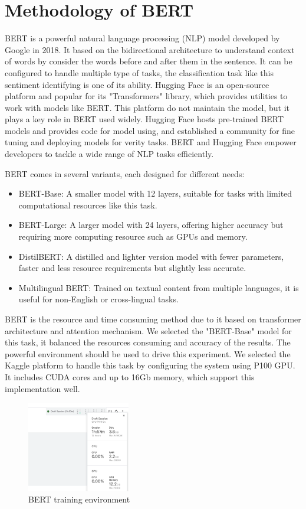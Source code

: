 \section{Methodology of BERT}

BERT is a powerful natural language processing (NLP) model developed by Google in 2018. It based on the bidirectional architecture to understand context of words by consider the words before and after them in the sentence. It can be configured to handle multiple type of tasks, the classification task like this sentiment identifying is one of its ability. Hugging Face is an open-source platform and popular for its "Transformers" library, which provides utilities to work with models like BERT. This platform do not maintain the model, but it plays a key role in BERT used widely. Hugging Face hosts pre-trained BERT models and provides code for model using, and established a community for fine tuning and deploying models for verity tasks. BERT and Hugging Face empower developers to tackle a wide range of NLP tasks efficiently.

BERT comes in several variants, each designed for different needs:

\begin{itemize}
    \item BERT-Base: A smaller model with 12 layers, suitable for tasks with limited computational resources like this task.
    \item BERT-Large: A larger model with 24 layers, offering higher accuracy but requiring more computing resource such as GPUs and memory.
    \item DistilBERT: A distilled and lighter version model with fewer parameters, faster and less resource requirements but slightly less accurate.
    \item Multilingual BERT: Trained on textual content from multiple languages, it is useful for non-English or cross-lingual tasks.
\end{itemize}

BERT is the resource and time consuming method due to it based on transformer architecture and attention mechanism. We selected the "BERT-Base" model for this task, it balanced the resources consuming and accuracy of the results. The powerful environment should be used to drive this experiment. We selected the Kaggle platform to handle this task by configuring the system using P100 GPU. It includes CUDA cores and up to 16Gb memory, which support this implementation well.

\begin{figure}[ht]
    \centering
    \includegraphics[width=0.4\textwidth]{pics/bert_consuming.png}
    \caption{BERT training environment}
\end{figure}

